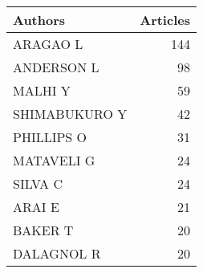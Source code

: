 
\begin{tabular}{lr}
\toprule
Authors & Articles\\
\midrule
ARAGAO L & 144\\
ANDERSON L & 98\\
MALHI Y & 59\\
SHIMABUKURO Y & 42\\
PHILLIPS O & 31\\
\addlinespace
MATAVELI G & 24\\
SILVA C & 24\\
ARAI E & 21\\
BAKER T & 20\\
DALAGNOL R & 20\\
\bottomrule
\end{tabular}